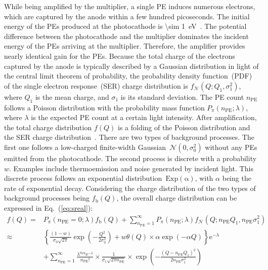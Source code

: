 While being amplified by the multiplier,
a single PE induces numerous electrons,
which are captured by the anode within a few hundred picoseconds.
The initial energy of the PEs produced at the photocathode is \SI{\sim 1}{eV}~\cite{Nathan1970TheED}.
The potential difference between the photocathode and the multiplier dominates the incident energy of the PEs arriving at the multiplier.
Therefore, the amplifier provides nearly identical gain for the PEs.
Because the total charge of the electrons captured by the anode is typically described by a Gaussian distribution in light of the central limit theorem of probability,
the probability density function~(PDF) of the single electron response~(SER) charge distribution is $f_{\mathcal{N}}(Q; Q_1,\sigma_1^2)$,
where $Q_1$ is the mean charge, and $\sigma_1$ is its standard deviation.
The PE count $n_{\mathrm{PE}}$ follows a Poisson distribution with the probability mass function $P_\pi(n_{\mathrm{PE}};\lambda)$,
where $\lambda$ is the expected PE count at a certain light intensity.
After amplification, the total charge distribution $f(Q)$ is a folding of the Poisson distribution and the SER charge distribution~\cite{1994Absolute}.
There are two types of background processes.
The first one follows a low-charged finite-width Gaussian~$\mathcal{N}(0,\sigma_0^2)$ without any PEs emitted from the photocathode.
The second process is discrete with a probability $w$.
Examples include thermoemission and noise generated by incident light.
This discrete process follows an exponential distribution~$\mathrm{Exp(\alpha)}$,
with $\alpha$ being the rate of exponential decay.
Considering the charge distribution of the two types of background processes being $f_{\mathrm{b}}(Q)$,
the overall charge distribution can be expressed in Eq.~(\ref{eq:sreal}):
\begin{equation}
	\begin{aligned}
		f(Q) =  & P_{\pi}(n_{\mathrm{PE}}=0;\lambda)f_{\mathrm{b}}(Q) + \sum_{n_{\mathrm{PE}}=1}^{\infty}P_{\pi}(n_{\mathrm{PE}};\lambda) f_{\mathcal{N}}(Q; n_{\mathrm{PE}}Q_1,n_{\mathrm{PE}}\sigma_1^2) \\
		\approx & \left\{\frac{(1-w)}{\sigma_0 \sqrt{2 \pi}} \exp \left(-\frac{Q^2}{2 \sigma_0^2}\right)
		+w \theta(Q)\times \alpha \exp \left(-\alpha Q\right)\right\} \mathrm{e}^{-\lambda}                                                                                                                \\
		        & +\sum_{n_{\mathrm{PE}}=1}^{\infty} \frac{\lambda^{n_{\mathrm{PE}}} \mathrm{e}^{-\lambda}}{n_{\mathrm{PE}} !}
		\times \frac{1}{\sigma_1 \sqrt{2 \pi n_{\mathrm{PE}}}}\times
		\exp \left(-\frac{\left(Q-n_{\mathrm{PE}} Q_1\right)^2}{2 n_{\mathrm{PE}} \sigma_1^2}\right)
	\end{aligned}
	\label{eq:sreal}
\end{equation}
